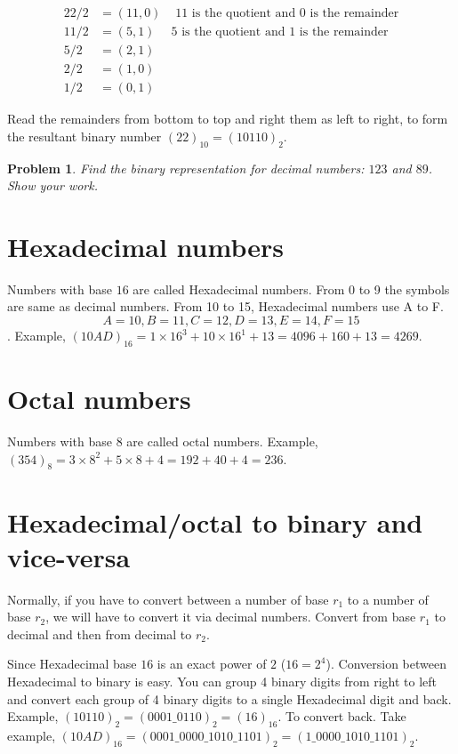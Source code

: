 \documentclass{article}
\newtheorem{prob}{Problem}
\begin{document}
\begin{align*}
  22 / 2 &= (11, 0) & \text{ 11 is the quotient and 0 is the remainder} \\
  11 / 2 &= (5, 1) & \text{5 is the quotient and 1 is the remainder}\\
  5 / 2 &= (2, 1) & \\ 
  2 / 2 &= (1, 0) & \\
  1 / 2 &= (0, 1) &
\end{align*}

Read the remainders from bottom to top and right them as left to right, to form the resultant binary number $(22)_{10} = (10110)_2$.

\begin{prob}
Find the binary representation for decimal numbers: $123$ and $89$. Show your work.
\end{prob}
\vspace{10em}


\section{Hexadecimal numbers}
Numbers with base $16$ are called Hexadecimal numbers. From 0 to 9 the symbols
are same as decimal numbers. From 10 to 15, Hexadecimal numbers use A to F.
\[ A = 10, B = 11, C = 12, D = 13, E = 14, F = 15 \]. Example, $(10AD)_{16} = 1
\times 16^3 + 10 \times 16^1 + 13 = 4096 + 160 + 13 = 4269$.

\section{Octal numbers}
Numbers with base $8$ are called octal numbers. Example, $(354)_8 = 3 \times 8^2
+ 5 \times 8 + 4 = 192 + 40 + 4 = 236$.



\section{Hexadecimal/octal to binary and vice-versa}
Normally, if you have to convert between a number of base $r_1$ to a number of
base $r_2$, we will have to convert it via decimal numbers. Convert from base
$r_1$ to decimal and then from decimal to $r_2$.

Since Hexadecimal base $16$ is an exact power of $2$ ($16 = 2^4$). Conversion
between Hexadecimal to binary is easy. You can group 4 binary digits from right
to left and convert each group of 4 binary digits to a single Hexadecimal digit
and back. Example, $(10110)_2 = (0001\_0110)_2 = (16)_{16}$. To convert back.
Take example, $(10AD)_{16} = (0001\_0000\_1010\_1101)_2 = (1\_0000\_1010\_1101)_2$.
\end{document}
